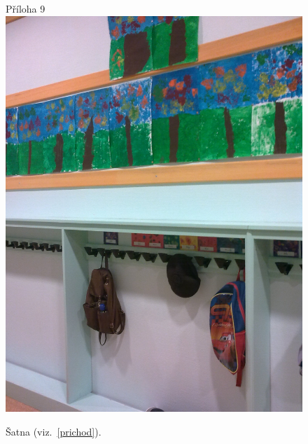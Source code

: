 	\begin{figure}[tb]
		\centering
		Příloha 9\\
		\includegraphics[height = 0.35\textheight]{./fotky/Obr9.jpg}
		\caption{
			Šatna (viz.~\ref{prichod}).
		}
		\label{Obr9}
	\end{figure}


